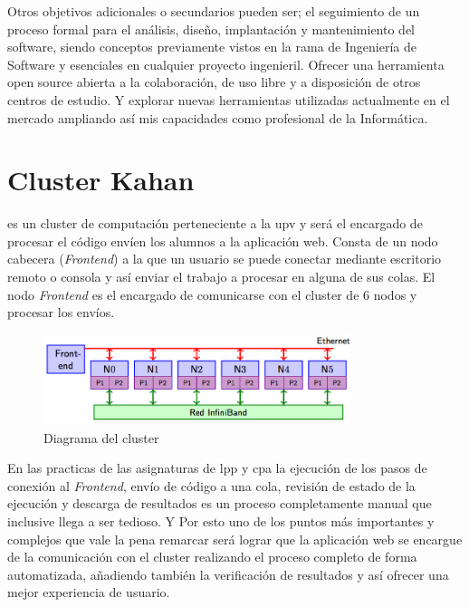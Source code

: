 \documentclass[11pt,spanish,listoffigures,listoftables]{tfgetsinf}
\begin{document}
Otros objetivos adicionales o secundarios pueden ser; el seguimiento de un proceso formal para el análisis, diseño, implantación y mantenimiento del software, siendo conceptos previamente vistos en la rama de Ingeniería de Software y esenciales en cualquier proyecto ingenieril. Ofrecer una herramienta \foreignlanguage{english}{open source} abierta a la colaboración, de uso libre y a disposición de otros centros de estudio. Y explorar nuevas herramientas utilizadas actualmente en el mercado ampliando así mis capacidades como profesional de la Informática.

\section{Cluster Kahan}

\kahan es un \foreignlanguage{english}{cluster} de computación perteneciente a la \acrshort{upv} y será el encargado de procesar el código envíen los alumnos a la aplicación web. Consta de un nodo cabecera (\textit{Frontend}) a la que un usuario se puede conectar mediante escritorio remoto o consola y así enviar el trabajo a procesar en alguna de sus colas. El nodo \textit{Frontend} es el encargado de comunicarse con el \foreignlanguage{english}{cluster} de 6 nodos y procesar los envíos.


\begin{figure}[!ht]
	\centering
	\includegraphics[width=0.8\textwidth]{img/kahan-cluster}
	\caption[Diagrama del cluster \kahan]{Diagrama del cluster \kahan}
	\label{figura:kahan-cluster}
\end{figure}

En las practicas de las asignaturas de \acrshort{lpp} y \acrshort{cpa} la ejecución de los pasos de conexión al \textit{Frontend}, envío de código a una cola, revisión de estado de la ejecución y descarga de resultados es un proceso completamente manual que inclusive llega a ser tedioso. Y Por esto uno de los puntos más importantes y complejos que vale la pena remarcar será lograr que la aplicación web se encargue de la comunicación con el \foreignlanguage{english}{cluster} realizando el proceso completo de forma automatizada, añadiendo también la verificación de resultados y así ofrecer una mejor experiencia de usuario.
\end{document}

